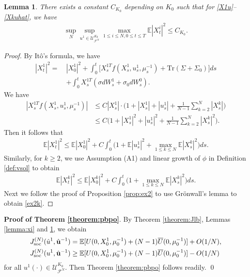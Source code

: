 \documentclass{amsart}
\newtheorem{lemma}[theorem]{Lemma}
\theoremstyle{definition}
\theoremstyle{remark}
\def\cal{\mathcal}
\def\EE{{\mathbb E}}
\numberwithin{equation}{section}
\begin{document}
\begin{lemma}\label{lemma:xm2}
 There exists a constant $C_{K_0}$ depending on $K_0$ such that
 for \eqref{X1u}--\eqref{Xkuhat},
we have
\begin{align}\label{ex2k}
\sup_N \sup_{u^1\in {\cal U}_{\cal F^N}^{K_0}} \max_{1\le i\le N, 0\le t\le T} \EE |X_t^i|^2\le C_{K_0}.
\end{align}
\end{lemma}

\begin{proof}
By It\^o's formula, we have
\begin{align*}
|X_t^1|^2=\ & |X_0^1|^2+ \int_0^t \Big[X_s^{1T}f(X_s^1,u^1_s, \mu^{-1}_s) +  \mbox{Tr} (\Sigma +\Sigma_0)\Big]ds\\
& +
\int_0^t X_s^{1T} (\sigma dW_s^1+\sigma_0dW^0_s).
\end{align*}
We have
\begin{align*}
|X_s^{1T}f(X_s^1,u^1_s, \mu^{-1}_s)| &\le C|X_s^1|\cdot
\Big(1+|X_s^1|+|u_s^1|+\frac{1}{N-1}\sum_{k=2}^N |X_s^k|\Big)\\
&\le C\Big(1+|X_s^1|^2+ |u_s^1|^2 + \frac{1}{N-1} \sum_{k=2}^N |X_s^k|^2\Big).
\end{align*}
Then it follows that
\begin{align}
\EE|X_t^1|^2 \le \EE|X_0^1|^2  + C\int_0^t \Big(1+ \EE|u_s^1|^2+\max_{1\le k\le N} \EE|X_s^k|^2\Big) ds.
\end{align}
Similarly,
for $k\ge 2$, we use Assumption (A1) and linear growth of
$\phi$ in Definition \ref{def:vsol} to obtain
\begin{align}
\EE|X_t^k|^2 \le \EE|X_0^k|^2  + C\int_0^t \Big(1+\max_{1\le k\le N} \EE|X_s^k|^2\Big) ds.
\end{align}
Next we follow the proof of Proposition \ref{prop:ex2} to  use Gr\"onwall's lemma to obtain  \eqref{ex2k}.
\end{proof}

{\bf Proof of Theorem \ref{theorem:pbpo}}.
By Theorem \ref{theorem:Jlb}, Lemmas \ref{lemma:xi} and \ref{lemma:xm2}, we obtain
\begin{align*}
&J^{(N)}_{\rm soc} (\hat u^1, \hat {\mathbf u}^{-1})= \EE [U(0, X_0^1, \mu_0^{-1})+(N-1) \overline U(0,  \mu_0^{-1})]+ O(1/N), \\
& J^{(N)}_{\rm soc} ( u^1, \hat {\mathbf u}^{-1})\ge \EE [U(0, X_0^1, \mu_0^{-1})+(N-1) \overline U(0,  \mu_0^{-1})]- O(1/N)
\end{align*}
for all $u^1(\cdot)\in  {\cal U}_{\cal F^N}^{K_0}$. Then Theorem
\ref{theorem:pbpo} follows readily.  \qed
\end{document}
